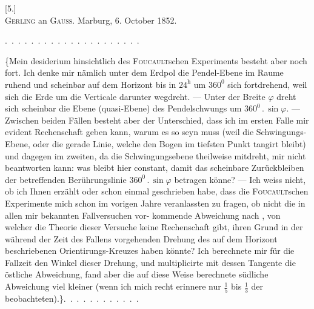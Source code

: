 \clearpage\begingroup{}
\begin{center}
[5.]\\[.7em]
\textsc{Gerling} an \textsc{Gauss}. Marburg, 6. October 1852.
\end{center}
\noindent .\ .\ .\ .\ .\ .\ .\ .\ .\ .\ .\ .\ .\ .\ .\ .\ .\ .\ .\ .\ .
\par\noindent\hspace*{\parindent}\{Mein desiderium hinsichtlich des \textsc{Foucault}schen Experiments besteht
aber noch fort. Ich denke mir nämlich unter dem Erdpol die Pendel-Ebene
im Raume ruhend und scheinbar auf dem Horizont bis in \(24^{\mathrm{h}}\) um \(360^{0}\) sich
fortdrehend, weil sich die Erde um die Verticale darunter wegdreht. —
Unter der Breite \(\varphi\) dreht sich scheinbar die Ebene (quasi-Ebene) des Pendelschwungs
um \(360^{0}\mathbin{.}\sin\varphi\). — Zwischen beiden Fällen besteht aber der Unterschied,
dass ich im ersten Falle mir evident  Rechenschaft geben
kann, warum es so seyn muss (weil die Schwingungs-Ebene, oder die gerade
Linie, welche den Bogen im tiefsten Punkt tangirt 
bleibt) und dagegen im zweiten, da die Schwingungsebene theilweise
mitdreht, mir nicht beantworten kann: was bleibt hier constant, damit das
scheinbare Zurückbleiben der betreffenden Berührungslinie \(360^{0}\mathbin{.}\sin\varphi\) betragen
könne? — Ich weiss nicht, ob ich Ihnen erzählt oder schon einmal geschrieben
habe, dass die \textsc{Foucault}schen Experimente mich schon im vorigen Jahre veranlassten
zu fragen, ob nicht die in allen mir bekannten Fallversuchen vor-
\clearpage{}
\noindent kommende Abweichung nach , von welcher die Theorie dieser Versuche
keine Rechenschaft gibt, ihren Grund in der während der Zeit des Fallens
vorgehenden Drehung des auf dem Horizont beschriebenen Orientirungs-Kreuzes
haben könnte? Ich berechnete mir für die Fallzeit den Winkel dieser Drehung,
und multiplicirte mit dessen Tangente die östliche Abweichung, fand
aber die auf diese Weise berechnete südliche Abweichung viel kleiner (wenn
ich mich recht erinnere nur \(\tfrac{1}{5}\) bis \(\tfrac{1}{3}\) der beobachteten).\}\quad .\ .\ .\ .\ .\ .\ .\ .\ .\ .\ .\ .
\clearpage\endgroup
